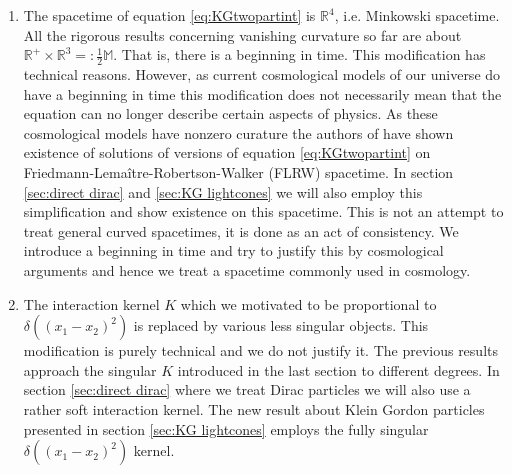 \documentclass[b5paper,draft,openbib,12pt]{memoir}
\newtheorem{Thm}[Def]{Theorem}
\begin{document}
\begin{enumerate}[label=\Alph*)]
\item \label{matt simplifying assumption 1} The spacetime of equation \eqref{eq:KGtwopartint} 
is \(\mathbb{R}^4\), i.e. Minkowski spacetime.
All the rigorous results concerning vanishing curvature so far 
are about
\(\mathbb{R}^+\times\mathbb{R}^3=:\frac{1}{2}\mathbb{M}\). 
That is, there is a beginning in time. This modification has 
technical reasons. However, as current 
cosmological models of our universe do have a beginning in 
time this modification does not necessarily
mean that the equation can no longer describe 
certain aspects of physics. As these cosmological models 
have nonzero curature the authors of \cite{lienertcurved} 
have shown existence of solutions of versions of 
equation \eqref{eq:KGtwopartint}
on Friedmann-Lemaître-Robertson-Walker (FLRW) spacetime. In 
section \ref{sec:direct dirac} and 
\ref{sec:KG lightcones} we will also employ this 
simplification and show existence on this spacetime. This is not 
an attempt to treat 
general curved spacetimes, it is done as an act of consistency. 
We introduce a beginning in time 
and try to justify this by cosmological arguments and hence 
we treat a spacetime commonly used
in cosmology.
\item \label{matt simplifying assumption 2} The interaction kernel \(K\) which we motivated to be 
proportional to \(\delta((x_1-x_2)^2)\)
is replaced by various less singular objects. This modification is 
purely technical and we do not 
justify it. The previous results approach the singular \(K\) 
introduced in the last section to different
degrees. In section \ref{sec:direct dirac} where we treat Dirac 
particles 
we will also use a rather soft interaction kernel. The new result 
about Klein Gordon particles presented in 
section \ref{sec:KG lightcones} employs the fully 
singular \(\delta((x_1-x_2)^2)\) kernel. 
\end{enumerate}

\end{document}
